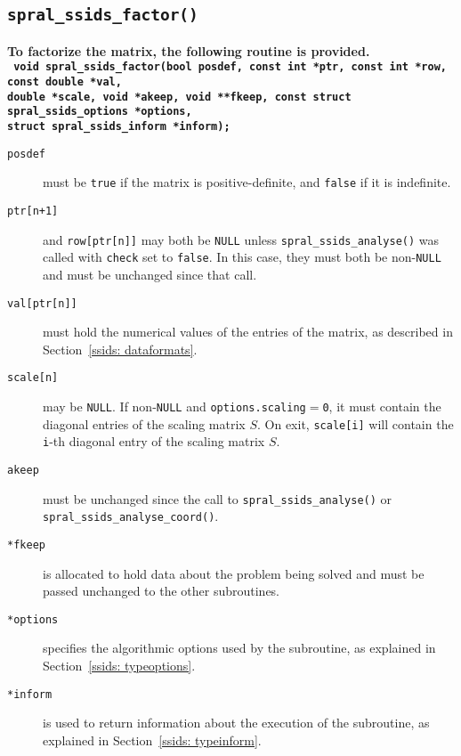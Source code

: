 \subsection{\texttt{spral\_ssids\_factor()}} \label{ssids: factorize}
\textbf{To factorize the matrix, the following routine is provided.
   \vspace*{0.1cm} \\
   \texttt{
      \hspace*{0.2cm} void spral\_ssids\_factor(bool posdef, const int *ptr, const int *row, const double *val, \\
      \hspace*{0.7cm} double *scale, void *akeep, void **fkeep,
         const struct spral\_ssids\_options *options, \\
      \hspace*{0.7cm} struct spral\_ssids\_inform *inform);
   }
}

\begin{description}
\item[\texttt{posdef}] must be {\tt true} if the matrix is positive-definite,
   and {\tt false} if it is indefinite.

\item[\texttt{ptr[n+1]}] and {\tt row[ptr[n]]} may both be \texttt{NULL} unless 
   {\tt spral\_ssids\_analyse()} was called with {\tt check} set to {\tt false}.
   In this case, they must both be non-\texttt{NULL} and must be unchanged
   since that call.

\item[\texttt{val[ptr[n]]}] must hold the numerical values of the entries of the
   matrix, as described in Section~\ref{ssids: dataformats}.

\item[\texttt{scale[n]}] may be \texttt{NULL}. If non-\texttt{NULL} and
   \texttt{options.scaling}$=$\texttt{0},
   it must contain the diagonal entries of the scaling matrix ${S}$.
   On exit, \texttt{scale[i]} will contain the \texttt{i}-th
   diagonal entry of the scaling matrix $S$.

\item[\texttt{akeep}] must be unchanged since the call to
   {\tt spral\_ssids\_analyse()} or {\tt spral\_ssids\_analyse\_coord()}.

\item[\texttt{*fkeep}] is allocated to hold data about the problem being
   solved and must be passed unchanged to the other subroutines.

\item[\texttt{*options}] specifies the algorithmic options used by the
   subroutine, as explained in Section~\ref{ssids: typeoptions}.

\item[\texttt{*inform}] is used to return information about the execution
   of the subroutine, as explained in Section~\ref{ssids: typeinform}.

\end{description}

